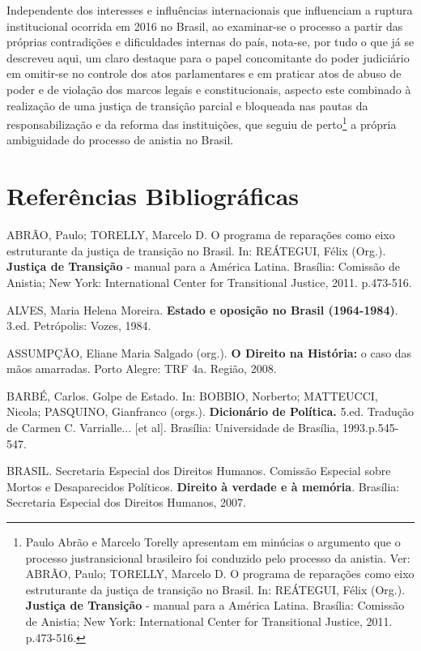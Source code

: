 Independente dos interesses e influências internacionais que influenciam
a ruptura institucional ocorrida em 2016 no Brasil, ao examinar-se o
processo a partir das próprias contradições e dificuldades internas do
país, nota-se, por tudo o que já se descreveu aqui, um claro destaque
para o papel concomitante do poder judiciário em omitir-se no controle
dos atos parlamentares e em praticar atos de abuso de poder e de
violação dos marcos legais e constitucionais, aspecto este combinado à
realização de uma justiça de transição parcial e bloqueada nas pautas da
responsabilização e da reforma das instituições, que seguiu de
perto\footnote{Paulo Abrão e Marcelo Torelly apresentam em minúcias o
  argumento que o processo justransicional brasileiro foi conduzido pelo
  processo da anistia. Ver: ABRÃO, Paulo; TORELLY, Marcelo D. O programa
  de reparações como eixo estruturante da justiça de transição no
  Brasil. In: REÁTEGUI, Félix (Org.). \textbf{Justiça de Transição} -
  manual para a América Latina. Brasília: Comissão de Anistia; New York:
  International Center for Transitional Justice, 2011. p.473-516.} a
própria ambiguidade do processo de anistia no Brasil.

\section{Referências Bibliográficas}

ABRÃO, Paulo; TORELLY, Marcelo D. O programa de reparações como eixo
estruturante da justiça de transição no Brasil. In: REÁTEGUI, Félix
(Org.). \textbf{Justiça de Transição} - manual para a América Latina.
Brasília: Comissão de Anistia; New York: International Center for
Transitional Justice, 2011. p.473-516.

ALVES, Maria Helena Moreira. \textbf{Estado e oposição no Brasil
(1964-1984)}. 3.ed. Petrópolis: Vozes, 1984.

ASSUMPÇÃO, Eliane Maria Salgado (org.). \textbf{O Direito na História:}
o caso das mãos amarradas. Porto Alegre: TRF 4a. Região, 2008.

BARBÉ, Carlos. Golpe de Estado. In: BOBBIO, Norberto; MATTEUCCI, Nicola;
PASQUINO, Gianfranco (orgs.). \textbf{Dicionário de Política.} 5.ed.
Tradução de Carmen C. Varrialle... {[}et al{]}. Brasília: Universidade
de Brasília, 1993.p.545-547.

BRASIL. Secretaria Especial dos Direitos Humanos. Comissão Especial
sobre Mortos e Desaparecidos Políticos. \textbf{Direito à verdade e à
memória}. Brasília: Secretaria Especial dos Direitos Humanos, 2007.

